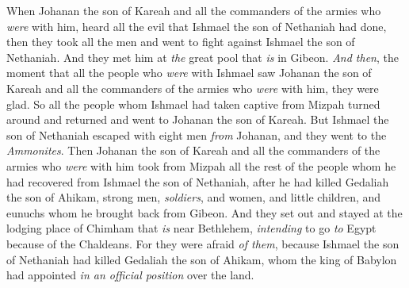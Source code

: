 \begin{biblechapter}
\verse When Johanan the son of Kareah and all the commanders of the armies who \textit{were} with him, heard all the evil that Ishmael the son of Nethaniah had done,
\verse then they took all the men and went to fight against Ishmael the son of Nethaniah. And they met him at \textit{the} great pool that \textit{is} in Gibeon.
\verse \textit{And then}, the moment that all the people who \textit{were} with Ishmael saw Johanan the son of Kareah and all the commanders of the armies who \textit{were} with him, they were glad.
\verse So all the people whom Ishmael had taken captive from Mizpah turned around and returned and went to Johanan the son of Kareah.
\verse But Ishmael the son of Nethaniah escaped with eight men \textit{from} Johanan, and they went to the \textit{Ammonites}.
\verse Then Johanan the son of Kareah and all the commanders of the armies who \textit{were} with him took from Mizpah all the rest of the people whom he had recovered from Ishmael the son of Nethaniah, after he had killed Gedaliah the son of Ahikam, strong men, \textit{soldiers}, and women, and little children, and eunuchs whom he brought back from Gibeon.
\verse And they set out and stayed at the lodging place of Chimham that \textit{is} near Bethlehem, \textit{intending} to go \textit{to} Egypt
\verse because of the Chaldeans. For they were afraid \textit{of them}, because Ishmael the son of Nethaniah had killed Gedaliah the son of Ahikam, whom the king of Babylon had appointed \textit{in an official position} over the land.
\end{biblechapter}

